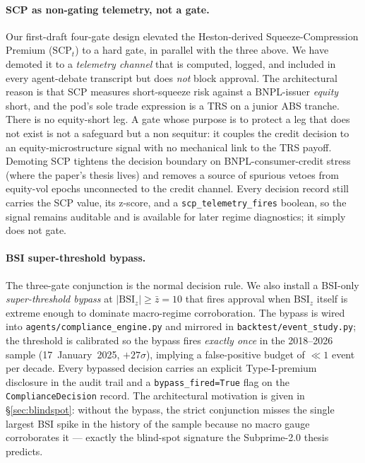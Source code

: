\documentclass[11pt,letterpaper]{article}
\newcommand{\bsi}{\text{BSI}}
\newcommand{\scp}{\text{SCP}}
\begin{document}
\paragraph{SCP as non-gating telemetry, not a gate.}
Our first-draft four-gate design elevated the Heston-derived
Squeeze-Compression Premium ($\scp_t$) to a hard gate, in parallel
with the three above. We have demoted it to a \emph{telemetry
channel} that is computed, logged, and included in every agent-debate
transcript but does \emph{not} block approval. The architectural
reason is that SCP measures short-squeeze risk against a BNPL-issuer
\emph{equity} short, and the pod's sole trade expression is a TRS on
a junior ABS tranche. There is no equity-short leg. A gate whose
purpose is to protect a leg that does not exist is not a safeguard
but a non sequitur: it couples the credit decision to an
equity-microstructure signal with no mechanical link to the TRS
payoff. Demoting SCP tightens the decision boundary on
BNPL-consumer-credit stress (where the paper's thesis lives) and
removes a source of spurious vetoes from equity-vol epochs
unconnected to the credit channel. Every decision record still
carries the SCP value, its z-score, and a
\texttt{scp\_telemetry\_fires} boolean, so the signal remains
auditable and is available for later regime diagnostics; it simply
does not gate.

\paragraph{BSI super-threshold bypass.}
The three-gate conjunction is the normal decision rule. We also
install a BSI-only \emph{super-threshold bypass} at
$|\bsi_z| \geq \bar{z} = 10$ that fires approval when $\bsi_z$
itself is extreme enough to dominate macro-regime corroboration.
The bypass is wired into
\texttt{agents/compliance\_engine.py} and mirrored in
\texttt{backtest/event\_study.py}; the threshold is calibrated so
the bypass fires \emph{exactly once} in the 2018--2026 sample
(17~January~2025, $+27\sigma$), implying a false-positive budget of
$\ll 1$ event per decade. Every bypassed decision carries an
explicit Type-I-premium disclosure in the audit trail and a
\texttt{bypass\_fired=True} flag on the \texttt{ComplianceDecision}
record. The architectural motivation is given in
\S\ref{sec:blindspot}: without the bypass, the strict conjunction
misses the single largest BSI spike in the history of the sample
because no macro gauge corroborates it --- exactly the blind-spot
signature the Subprime-2.0 thesis predicts.
\end{document}

